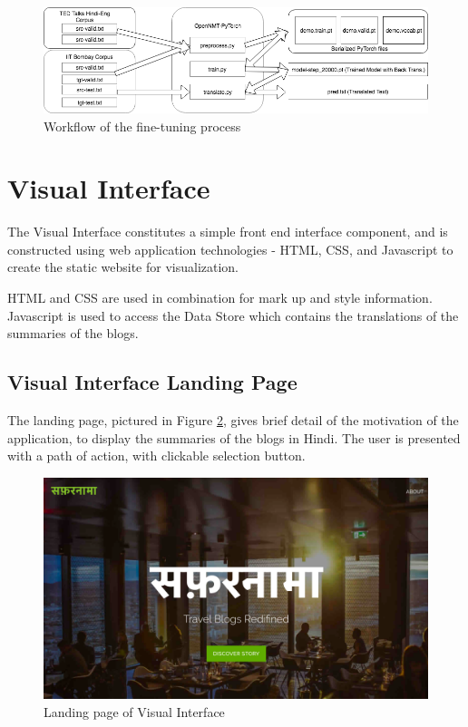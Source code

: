 \begin{figure}[h]
\includegraphics[width=\textwidth]{figures/nmtworkflow1.png}
\caption{Workflow of the fine-tuning process} 
\label{nmtwork1}
\end{figure}

\section{Visual Interface}
The Visual Interface constitutes a simple front end interface component, and is constructed using web application technologies - HTML, CSS, and Javascript to create the static website for visualization.

HTML and CSS are used in combination for mark up and style information. Javascript is used to access the Data Store which contains the translations of the summaries of the blogs.

\subsection{Visual Interface Landing Page}
The landing page, pictured in Figure \ref{display22}, gives brief detail of the motivation of the application, to display the summaries of the blogs in Hindi. The user is presented with a path of action, with clickable selection button.
\begin{figure}[h]
\includegraphics[width=\textwidth]{figures/safarnama1.png}
\caption{Landing page of Visual Interface} 
\label{display22}
\end{figure}

